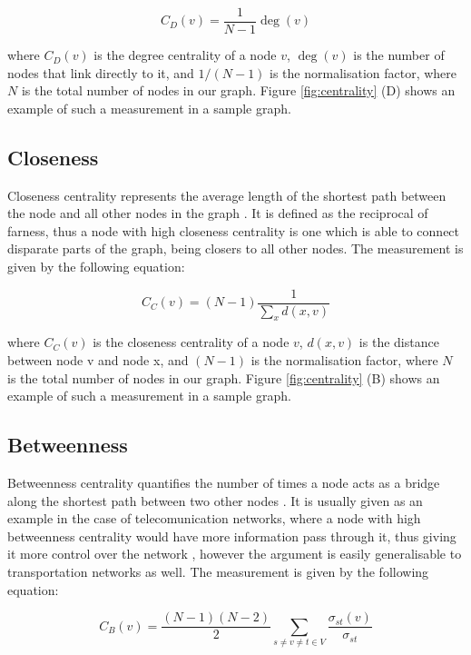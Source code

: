\documentclass[bsc,frontabs,twoside,singlespacing,parskip,deptreport]{infthesis}
\begin{document}
\begin{equation}
	C_D(v) = \frac{1}{N-1}\deg(v)
\end{equation}

where $C_D(v)$ is the degree centrality of a node $v$, $\deg(v)$ is the number of nodes that link directly to it, and $1/(N-1)$ is the normalisation factor, where $N$ is the total number of nodes in our graph. Figure \ref{fig:centrality} (D) shows an example of such a measurement in a sample graph.

\subsection{Closeness}

Closeness centrality represents the average length of the shortest path between the node and all other nodes in the graph \cite{BavelasAlex1950CPiT}. It is defined as the reciprocal of farness, thus a node with high closeness centrality is one which is able to connect disparate parts of the graph, being closers to all other nodes. The measurement is given by the following equation:

\begin{equation}
	C_C(v)= (N-1)\frac{1}{\sum_x d(x,v)}
\end{equation}

where $C_C(v)$ is the closeness centrality of a node $v$, $d(x,v)$ is the distance between node v and node x, and $(N-1)$ is the normalisation factor, where $N$ is the total number of nodes in our graph. Figure \ref{fig:centrality} (B) shows an example of such a measurement in a sample graph.

\subsection{Betweenness}

Betweenness centrality quantifies the number of times a node acts as a bridge along the shortest path between two other nodes \cite{freeman}. It is usually given as an example in the case of telecomunication networks, where a node with high betweenness centrality would have more information pass through it, thus giving it more control over the network \cite{freeman}, however the argument is easily generalisable to transportation networks as well. The measurement is given by the following equation:

\begin{equation}
	C_B(v) = \frac{(N-1)(N-2)}{2}\sum_{s \neq v \neq t \in V}\frac{\sigma_{st}(v)}{\sigma_{st}}
\end{equation}
\end{document}

